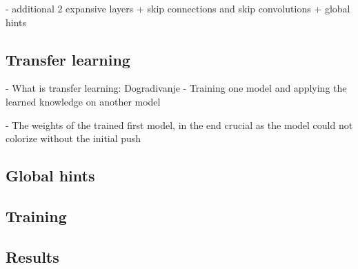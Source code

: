 \clearpage
- additional 2 expansive layers + skip connections and skip convolutions + global hints

\subsection{Transfer learning}

- What is transfer learning:
	Dogradivanje
	- Training one model and applying the learned knowledge on another model
	
- The weights of the trained first model, in the end crucial as the model could not colorize without the initial push

\subsection{Global hints}
\label{sec:global}


\subsection{Training}

\subsection{Results}